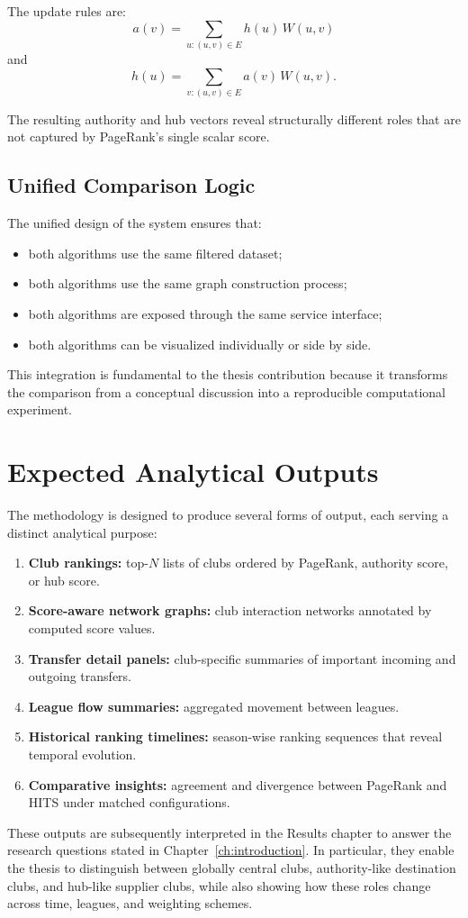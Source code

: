 The update rules are:
\[
a(v) = \sum_{u:(u,v)\in E} h(u)\,W(u,v)
\]
and
\[
h(u) = \sum_{v:(u,v)\in E} a(v)\,W(u,v).
\]

The resulting authority and hub vectors reveal structurally different roles that are not captured by PageRank's single scalar score.

\subsection{Unified Comparison Logic}
\label{subsec:unified_comparison_logic}

The unified design of the system ensures that:
\begin{itemize}
    \item both algorithms use the same filtered dataset;
    \item both algorithms use the same graph construction process;
    \item both algorithms are exposed through the same service interface;
    \item both algorithms can be visualized individually or side by side.
\end{itemize}

This integration is fundamental to the thesis contribution because it transforms the comparison from a conceptual discussion into a reproducible computational experiment.


\section{Expected Analytical Outputs}
\label{sec:expected_outputs}

The methodology is designed to produce several forms of output, each serving a distinct analytical purpose:

\begin{enumerate}
    \item \textbf{Club rankings:} top-$N$ lists of clubs ordered by PageRank, authority score, or hub score.
    \item \textbf{Score-aware network graphs:} club interaction networks annotated by computed score values.
    \item \textbf{Transfer detail panels:} club-specific summaries of important incoming and outgoing transfers.
    \item \textbf{League flow summaries:} aggregated movement between leagues.
    \item \textbf{Historical ranking timelines:} season-wise ranking sequences that reveal temporal evolution.
    \item \textbf{Comparative insights:} agreement and divergence between PageRank and HITS under matched configurations.
\end{enumerate}

These outputs are subsequently interpreted in the Results chapter to answer the research questions stated in Chapter~\ref{ch:introduction}. In particular, they enable the thesis to distinguish between globally central clubs, authority-like destination clubs, and hub-like supplier clubs, while also showing how these roles change across time, leagues, and weighting schemes.

